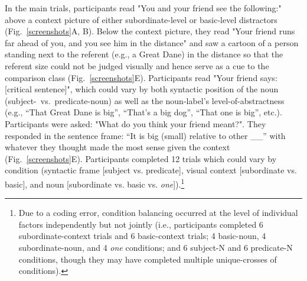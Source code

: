 \documentclass[10pt,letterpaper]{article}
\newcommand{\pt}[1]{\textcolor{Purple}{[pt: #1]}}
\begin{document}
In the main trials, participants read "You and your friend see the following:" above a context picture of either subordinate-level or basic-level distractors (Fig.~\ref{screenshots}A, B). 
Below the context picture, they read "Your friend runs far ahead of you, and you see him in the distance" and saw a cartoon of a person standing next to the referent (e.g., a Great Dane) in the distance so that the referent size could not be judged visually and hence serve as a cue to the comparison class (Fig.~\ref{screenshots}E). 
Participants read "Your friend says: [critical sentence]", which could vary by both syntactic position of the noun (subject-~vs.~predicate-noun) as well as the noun-label's level-of-abstractness (e.g., ``That Great Dane is big'', ``That's a big dog'', ``That one is big'', etc.). 
Participants were asked: "What do you think your friend meant?". 
They responded in the sentence frame: “It is big (small) relative to other \_\_” with whatever they thought made the most sense given the context (Fig.~\ref{screenshots}E).
Participants completed 12 trials which could vary by condition (syntactic frame [subject vs. predicate], visual context [subordinate vs. basic], and noun [subordinate vs. basic vs. \emph{one}]).\footnote{Due to a coding error, condition balancing occurred at the level of individual factors independently but not jointly (i.e., participants completed 6 subordinate-context trials and 6 basic-context trials; 4 basic-noun, 4 subordinate-noun, and 4 \emph{one} conditions; and 6 subject-N and 6 predicate-N conditions, though they may have completed multiple unique-crosses of conditions).}
\end{document}
